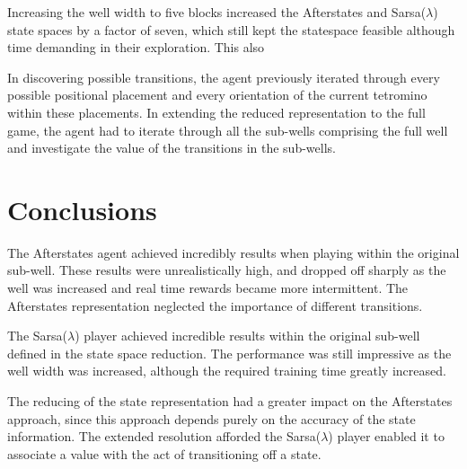 \documentclass{rucsthesis}
\begin{document}
Increasing the well width to five blocks increased the Afterstates and Sarsa($\lambda$) state spaces by a factor of seven, which still kept the statespace feasible although time demanding in their exploration. This also 
 
In discovering possible transitions, the agent previously iterated through every possible positional placement and every orientation of the current tetromino within these placements. In extending the reduced representation to the full game, the agent had to iterate through all the sub-wells comprising the full well and investigate the value of the transitions in the sub-wells.


\chapter{Conclusions}

The Afterstates agent achieved incredibly results when playing within the original sub-well. These results were unrealistically high, and dropped off sharply as the well was increased and real time rewards became more intermittent. The Afterstates representation neglected the importance of different transitions.

The Sarsa($\lambda$) player achieved incredible results within the original sub-well defined in the state space reduction. The performance was still impressive as the well width was increased, although the required training time greatly increased.

The reducing of the state representation had a greater impact on the Afterstates approach, since this approach depends purely on the accuracy of the state information. The extended resolution afforded the Sarsa($\lambda$) player enabled it to associate a value with the act of transitioning off a state. 


\end{document}
